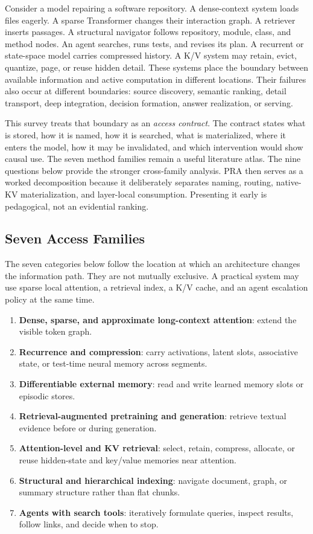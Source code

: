 \documentclass[10pt,a4paper]{article}
\begin{document}
Consider a model repairing a software repository. A dense-context system loads files
eagerly. A sparse Transformer changes their interaction graph. A retriever inserts passages.
A structural navigator follows repository, module, class, and method nodes. An agent searches,
runs tests, and revises its plan. A recurrent or state-space model carries compressed history.
A K/V system may retain, evict, quantize, page, or reuse hidden detail. These systems place the
boundary between available information and active computation in different locations. Their
failures also occur at different boundaries: source discovery, semantic ranking, detail
transport, deep integration, decision formation, answer realization, or serving.

This survey treats that boundary as an \emph{access contract}. The contract states what is
stored, how it is named, how it is searched, what is materialized, where it enters the model,
how it may be invalidated, and which intervention would show causal use. The seven method
families remain a useful literature atlas. The nine questions below provide the stronger
cross-family analysis. PRA then serves as a worked decomposition because it deliberately
separates naming, routing, native-KV materialization, and layer-local consumption. Presenting
it early is pedagogical, not an evidential ranking.

\subsection{Seven Access Families}
The seven categories below follow the location at which an architecture changes the information path. They are not mutually exclusive. A practical system may use sparse local attention, a retrieval index, a K/V cache, and an agent escalation policy at the same time.
\begin{enumerate}
\item \textbf{Dense, sparse, and approximate long-context attention}: extend the visible token graph.
\item \textbf{Recurrence and compression}: carry activations, latent slots, associative state, or test-time neural memory across segments.
\item \textbf{Differentiable external memory}: read and write learned memory slots or episodic stores.
\item \textbf{Retrieval-augmented pretraining and generation}: retrieve textual evidence before or during generation.
\item \textbf{Attention-level and KV retrieval}: select, retain, compress, allocate, or reuse hidden-state and key/value memories near attention.
\item \textbf{Structural and hierarchical indexing}: navigate document, graph, or summary structure rather than flat chunks.
\item \textbf{Agents with search tools}: iteratively formulate queries, inspect results, follow links, and decide when to stop.
\end{enumerate}
\end{document}
